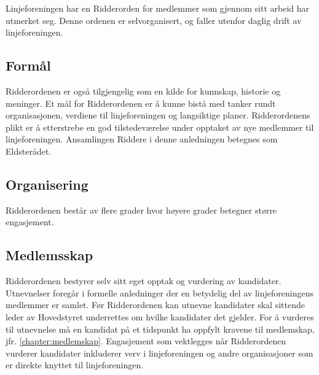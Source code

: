 Linjeforeningen har en Ridderorden for medlemmer som gjennom sitt arbeid har utmerket seg. Denne ordenen er selvorganisert, og faller utenfor daglig drift av linjeforeningen.

\subsection{Formål}
Ridderordenen er også tilgjengelig som en kilde for kunnskap, historie og meninger. Et mål for Ridderordenen er å kunne bistå med tanker rundt organisasjonen, verdiene til linjeforeningen og langsiktige planer.
Ridderordenens plikt er å etterstrebe en god tilstedeværelse under opptaket av nye medlemmer til linjeforeningen. Ansamlingen Riddere i denne anledningen betegnes som Eldsterådet.


\subsection{Organisering}{
Ridderordenen består av flere grader hvor høyere grader betegner større engasjement.
}

\subsection{Medlemsskap}{
Ridderordenen bestyrer selv sitt eget opptak og vurdering av kandidater. Utnevnelser foregår i formelle anledninger der en betydelig del av linjeforeningens medlemmer er samlet. Før Ridderordenen kan utnevne kandidater skal sittende leder av Hovedstyret underrettes om hvilke kandidater det gjelder. For å vurderes til utnevnelse må en kandidat på et tidspunkt ha oppfylt kravene til medlemskap, jfr. \ref{chapter:medlemskap}. Engasjement som vektlegges når Ridderordenen vurderer kandidater inkluderer verv i linjeforeningen og andre organisasjoner som er direkte knyttet til linjeforeningen.
}
